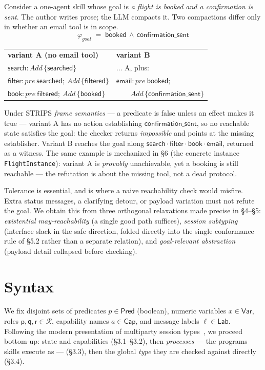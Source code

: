 \documentclass[11pt]{article}
\theoremstyle{plain}
\theoremstyle{definition}
\newcommand{\CapS}{\mathsf{Cap}}
\newcommand{\Pred}{\mathsf{Pred}}
\newcommand{\Var}{\mathsf{Var}}
\newcommand{\Lab}{\mathsf{Lab}}
\newcommand{\pre}{\mathit{pre}}
\newcommand{\Add}{\mathit{Add}}
\newcommand{\gphi}{\varphi_{\mathit{goal}}}
\newcommand{\id}[1]{\texttt{#1}}
\begin{document}
Consider a one-agent skill whose goal is \emph{a flight is booked and a
confirmation is sent}. The author writes prose; the LLM compacts it. Two
compactions differ only in whether an email tool is in scope.
\[
\gphi \;=\; \mathsf{booked} \,\wedge\, \mathsf{confirmation\_sent}
\]
\begin{center}\small
\begin{tabular}{@{}ll@{}}
\textbf{variant A (no email tool)} & \textbf{variant B} \\
$\mathsf{search}: \Add\,\{\mathsf{searched}\}$ & $\dots$ A, plus: \\
$\mathsf{filter}: \pre\ \mathsf{searched};\ \Add\,\{\mathsf{filtered}\}$ & $\mathsf{email}: \pre\ \mathsf{booked};$ \\
$\mathsf{book}: \pre\ \mathsf{filtered};\ \Add\,\{\mathsf{booked}\}$ & $\qquad\Add\,\{\mathsf{confirmation\_sent}\}$
\end{tabular}
\end{center}
Under STRIPS \emph{frame semantics} --- a predicate is false unless an effect
makes it true --- variant A has no action establishing
$\mathsf{confirmation\_sent}$, so no reachable state satisfies the goal: the
checker returns \emph{impossible} and points at the missing establisher. Variant B
reaches the goal along $\mathsf{search}\cdot\mathsf{filter}\cdot\mathsf{book}\cdot
\mathsf{email}$, returned as a witness. The same example is mechanized in \S6 (the
concrete instance \id{FlightInstance}): variant A is \emph{provably} unachievable,
yet a booking is still reachable --- the refutation is about the missing tool, not
a dead protocol.

Tolerance is essential, and is where a naive reachability check would misfire.
Extra status messages, a clarifying detour, or payload variation must not refute
the goal. We obtain this from three orthogonal relaxations made precise in
\S4--\S5: \emph{existential may-reachability} (a single good path suffices),
\emph{session subtyping} (interface slack in the safe direction, folded directly
into the single conformance rule of \S5.2 rather than a separate relation), and
\emph{goal-relevant abstraction} (payload detail collapsed before checking).

\section{Syntax}

We fix disjoint sets of predicates $p\in\Pred$ (boolean), numeric variables
$x\in\Var$, roles $\mathsf{p},\mathsf{q},\mathsf{r}\in\mathcal R$, capability names
$a\in\CapS$, and message labels $\ell\in\Lab$. Following the modern
presentation of multiparty session types~\cite{yoshidagheri,ghilezan,scalasyoshida},
we proceed bottom-up: state and capabilities (\S3.1--\S3.2), then
\emph{processes} --- the programs skills execute as --- (\S3.3), then the
global \emph{type} they are checked against directly (\S3.4).
\end{document}
